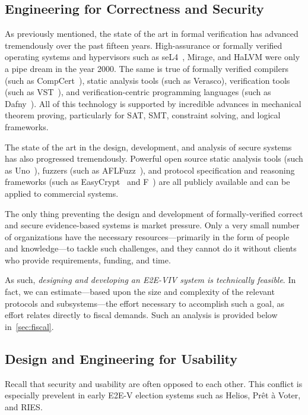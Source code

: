 \subsection{Engineering for Correctness and Security}

As previously mentioned, the state of the art in formal verification
has advanced tremendously over the past fifteen years. High-assurance
or formally verified operating systems and hypervisors such as
seL4~\cite{klein2009sel4}, Mirage, and HaLVM were only a pipe dream in the year
2000. The same is true of formally verified compilers (such as
CompCert~\cite{CompCert}), static analysis tools (such as Verasco),
verification tools (such as VST~\cite{VST}), and verification-centric
programming languages (such as Dafny~\cite{Dafny}). All of this
technology is supported by incredible advances in mechanical theorem
proving, particularly for SAT, SMT, constraint solving, and logical
frameworks.

The state of the art in the design, development, and analysis of
secure systems has also progressed tremendously. Powerful open source
static analysis tools (such as Uno~\cite{holzmann2002static}), fuzzers (such as
AFLFuzz~\cite{AFLFuzz}), and protocol specification and reasoning
frameworks (such as EasyCrypt~\cite{EasyCrypt} and F\*~\cite{Fstar})
are all publicly available and can be applied to commercial systems.

The only thing preventing the design and development of
formally-verified correct and secure evidence-based systems is market
pressure. Only a very small number of organizations have the necessary
resources---primarily in the form of people and knowledge---to tackle
such challenges, and they cannot do it without clients who provide
requirements, funding, and time.

As such, \emph{designing and developing an E2E-VIV system is
  technically feasible}.  In fact, we can estimate---based upon the
size and complexity of the relevant protocols and subsystems---the
effort necessary to accomplish such a goal, as effort relates directly
to fiscal demands. Such an analysis is provided below
in~\autoref{sec:fiscal}.

\subsection{Design and Engineering for Usability}

Recall that security and usability are often opposed to each other.
This conflict is especially prevelent in early E2E-V election systems
such as Helios, Prêt à Voter, and RIES.


